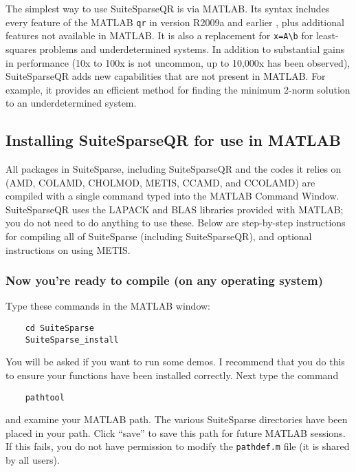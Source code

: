 \documentclass[12pt]{article}
\begin{document}
The simplest way to use SuiteSparseQR is via MATLAB.  Its syntax includes every
feature of the MATLAB \verb'qr' in version R2009a and earlier
\cite{GilbertMolerSchreiber}, plus additional features not available in MATLAB.
It is also a replacement for \verb'x=A\b' for least-squares problems and
underdetermined systems.  In addition to substantial gains in performance (10x
to 100x is not uncommon, up to 10,000x has been observed), SuiteSparseQR adds
new capabilities that are not present in MATLAB.  For example, it provides an
efficient method for finding the minimum 2-norm solution to an underdetermined
system.

\subsection{Installing SuiteSparseQR for use in MATLAB}

All packages in SuiteSparse, including SuiteSparseQR and the codes it relies on
(AMD, COLAMD, CHOLMOD, METIS, CCAMD, and CCOLAMD) are compiled with a single
command typed into the MATLAB Command Window.  SuiteSparseQR uses the LAPACK
and BLAS libraries provided with MATLAB; you do not need to do anything to use
these.  Below are step-by-step instructions for compiling all of SuiteSparse
(including SuiteSparseQR), and optional instructions on using METIS.

\subsubsection{Now you're ready to compile (on any operating system)}

Type these commands in the MATLAB window:
\begin{verbatim}
    cd SuiteSparse
    SuiteSparse_install
\end{verbatim}
You will be asked if you want to run some demos.  I recommend that you do this
to ensure your functions have been installed correctly.  Next type the command
\begin{verbatim}
    pathtool
\end{verbatim}
and examine your MATLAB path.  The various SuiteSparse directories have been
placed in your path.  Click ``save'' to save this path for future MATLAB
sessions.  If this fails, you do not have permission to modify the
\verb'pathdef.m' file (it is shared by all users).
\end{document}
